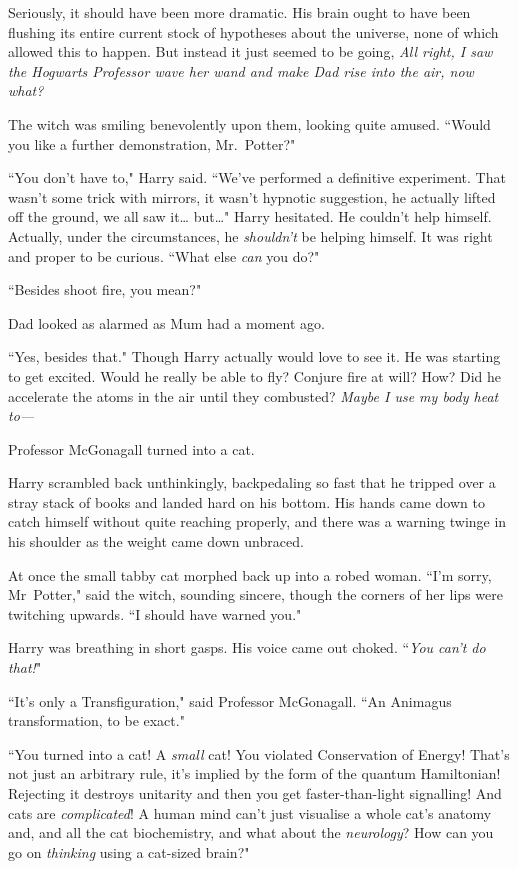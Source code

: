 Seriously, it should have been more dramatic. His brain ought to have been flushing its entire current stock of hypotheses about the universe, none of which allowed this to happen. But instead it just seemed to be going, \emph{All right, I saw the Hogwarts Professor wave her wand and make Dad rise into the air, now what?}

The witch was smiling benevolently upon them, looking quite amused. ``Would you like a further demonstration, Mr.~Potter?"

``You don't have to," Harry said. ``We've performed a definitive experiment. That wasn't some trick with mirrors, it wasn't hypnotic suggestion, he actually lifted off the ground, we all saw it{\ldots} but{\ldots}" Harry hesitated. He couldn't help himself. Actually, under the circumstances, he \emph{shouldn't} be helping himself. It was right and proper to be curious. ``What else \emph{can} you do?"

``Besides shoot fire, you mean?"

Dad looked as alarmed as Mum had a moment ago.

``Yes, besides that." Though Harry actually would love to see it. He was starting to get excited. Would he really be able to fly? Conjure fire at will? How? Did he accelerate the atoms in the air until they combusted? \emph{Maybe I use my body heat to---}

Professor McGonagall turned into a cat.

Harry scrambled back unthinkingly, backpedaling so fast that he tripped over a stray stack of books and landed hard on his bottom. His hands came down to catch himself without quite reaching properly, and there was a warning twinge in his shoulder as the weight came down unbraced.

At once the small tabby cat morphed back up into a robed woman. ``I'm sorry, Mr~Potter," said the witch, sounding sincere, though the corners of her lips were twitching upwards. ``I should have warned you."

Harry was breathing in short gasps. His voice came out choked. ``\emph{You can't \emph{do} that!}"

``It's only a Transfiguration," said Professor McGonagall. ``An Animagus transformation, to be exact."

``You turned into a cat! A \emph{small} cat! You violated Conservation of Energy! That's not just an arbitrary rule, it's implied by the form of the quantum Hamiltonian! Rejecting it destroys unitarity and then you get faster-than-light signalling! And cats are \emph{complicated}! A human mind can't just visualise a whole cat's anatomy and, and all the cat biochemistry, and what about the \emph{neurology}? How can you go on \emph{thinking} using a cat-sized brain?"

